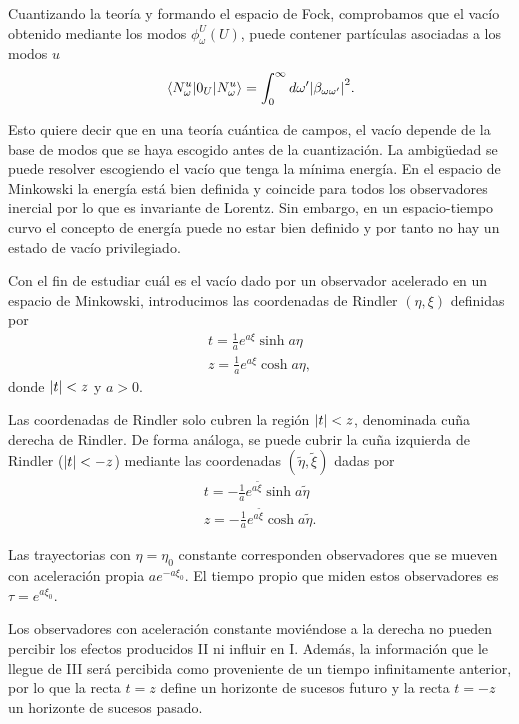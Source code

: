 Cuantizando la teoría y formando el espacio de Fock, comprobamos que el vacío obtenido mediante
los modos $\phi^U_\omega (U)$, puede contener partículas asociadas a los modos $u$
\begin{equation}
  \ev{0_U}{N_\omega^u}=\int_0^\infty d\omega' \abs{\beta_{\omega\omega'}}^2.
\end{equation}

Esto quiere decir que en una teoría cuántica de campos, el vacío depende de la base de modos
que se haya escogido antes de la cuantización.
La ambigüedad se puede resolver escogiendo el vacío que tenga la mínima energía.
En el espacio de Minkowski la energía está bien definida y coincide para todos los observadores
inercial por lo que es invariante de Lorentz.
Sin embargo, en un espacio-tiempo curvo el concepto de energía puede no estar bien definido
y por tanto no hay un estado de vacío privilegiado.

Con el fin de estudiar cuál es el vacío dado por un observador acelerado en un espacio de 
Minkowski, introducimos las coordenadas de Rindler $(\eta,\xi)$ definidas por
\begin{gather}
  t=\frac{1}{a} e^{a\xi} \sinh a\eta \\
  z=\frac{1}{a}e^{a\xi} \cosh a\eta,
\end{gather}
donde $\abs{t}<z$ y $a>0$.

Las coordenadas de Rindler solo cubren la región $\abs{t}<z$, denominada cuña derecha de Rindler.
De forma análoga, se puede cubrir la cuña izquierda de Rindler ($\abs{t}<-z$) mediante
las coordenadas $(\tilde \eta, \tilde \xi)$ dadas por
\begin{gather}
  t=-\frac{1}{a} e^{a\tilde \xi} \sinh a\tilde \eta \\
  z=-\frac{1}{a} e^{a\tilde \xi} \cosh a\tilde \eta.
\end{gather}

Las trayectorias con $\eta=\eta_0$ constante corresponden observadores que se mueven con
aceleración propia $ae^{-a\xi_0}$.
El tiempo propio que miden estos observadores es $\tau = e^{a\xi_0}$.

Los observadores con aceleración constante moviéndose a la derecha no pueden percibir los 
efectos producidos II ni influir en I. 
Además, la información que le llegue de III será percibida como proveniente de un tiempo
infinitamente anterior, por lo que la recta $t=z$ define un horizonte de sucesos futuro y 
la recta $t=-z$ un horizonte de sucesos pasado.

